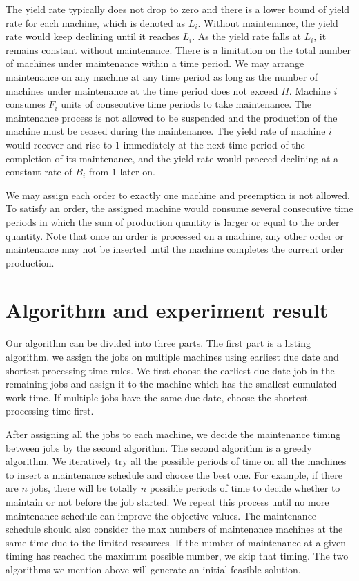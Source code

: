 \documentclass[12pt,a4page]{article}
\theoremstyle{definition}
\theoremstyle{remark}
\begin{document}
The yield rate typically does not drop to zero and there is a lower bound of yield rate for each machine, which is denoted as $L_i$. Without maintenance, the yield rate would keep declining until it reaches $L_i$. As the yield rate falls at $L_i$, it remains constant without maintenance. There is a limitation on the total number of machines under maintenance within a time period. We may arrange maintenance on any machine at any time period as long as the number of machines under maintenance at the time period does not exceed $H$. Machine $i$ consumes $F_i$ units of consecutive time periods to take maintenance. The maintenance process is not allowed to be suspended and the production of the machine must be ceased during the maintenance. The yield rate of machine $i$ would recover and rise to 1 immediately at the next time period of the completion of its maintenance, and the yield rate would proceed declining at a constant rate of $B_i$ from $1$ later on.

We may assign each order to exactly one machine and preemption is not allowed. To satisfy an order, the assigned machine would consume several consecutive time periods in which the sum of production quantity is larger or equal to the order quantity. Note that once an order is processed on a machine, any other order or maintenance may not be inserted until the machine completes the current order production.

\section{Algorithm and experiment result}

Our algorithm can be divided into three parts. The first part is a listing algorithm. we assign the jobs on multiple machines using earliest due date and shortest processing time rules. We first choose the earliest due date job in the remaining jobs and assign it to the machine which has the smallest cumulated work time. If multiple jobs have the same due date, choose the shortest processing time first.

After assigning all the jobs to each machine, we decide the maintenance timing between jobs by the second algorithm. The second algorithm is a greedy algorithm. We iteratively try all the possible periods of time on all the machines to insert a maintenance schedule and choose the best one. For example, if there are $n$ jobs, there will be totally $n$ possible periods of time to decide whether to maintain or not before the job started. We repeat this process until no more maintenance schedule can improve the objective values. The maintenance schedule should also consider the max numbers of maintenance machines at the same time due to the limited resources. If the number of maintenance at a given timing has reached the maximum possible number, we skip that timing. The two algorithms we mention above will generate an initial feasible solution.
\end{document}
